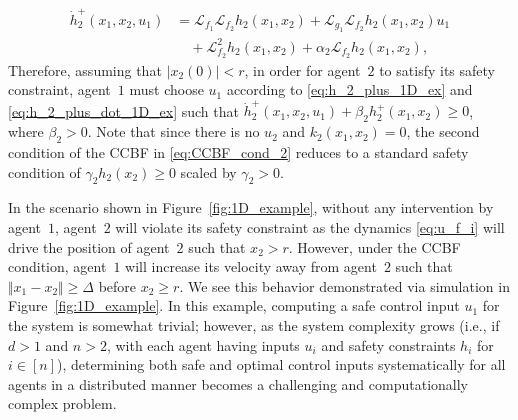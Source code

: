 \documentclass[letterpaper, 10 pt, conference]{ieeeconf}  %
\theoremstyle{plain}
\begin{document}
\vspace{-3.5ex}
\small
\begin{align}
    \dot{h}_2^+(x_1, x_2, u_1) &= \mathcal{L}_{f_1} \mathcal{L}_{f_2}  h_2(x_1, x_2) + \mathcal{L}_{g_1} \mathcal{L}_{f_2}  h_2(x_1, x_2) u_1 \nonumber \\ 
    & \quad + \mathcal{L}_{f_2}^2 h_2(x_1, x_2) + \alpha_2 \mathcal{L}_{f_2}h_2(x_1, x_2), \label{eq:h_2_plus_dot_1D_ex}
\end{align}
\normalsize
Therefore, assuming that $\vert x_2(0) \vert < r$, in order for agent~$2$ to satisfy its safety constraint, agent~$1$ must choose $u_1$ according to \eqref{eq:h_2_plus_1D_ex} and \eqref{eq:h_2_plus_dot_1D_ex} such that
$\dot{h}_2^+(x_1, x_2, u_1) + \beta_2 h_2^+(x_1, x_2) \geq 0$,
where $\beta_2 > 0$. Note that since there is no $u_2$ and $k_2(x_1, x_2) = 0$, the second condition of the CCBF in \eqref{eq:CCBF_cond_2} reduces to a standard safety condition of $\gamma_2 h_2(x_2) \geq 0$ scaled by $\gamma_2>0$. 

In the scenario shown in Figure~\ref{fig:1D_example}, without any intervention by agent~$1$, agent~$2$ will violate its safety constraint as the dynamics \eqref{eq:u_f_i} will drive the position of agent~$2$ such that $x_2 > r$. However, under the CCBF condition, agent~$1$ will increase its velocity away from agent~$2$ such that $\Vert x_1-x_2 \Vert \geq \Delta$  before $x_2 \geq r$. We see this behavior demonstrated via simulation in Figure~\ref{fig:1D_example}.
In this example, computing a safe control input $u_1$ for the system is somewhat trivial; however, as the system complexity grows (i.e., if $d>1$ and $n>2$, with each agent having inputs $u_i$ and safety constraints $h_i$ for $i \in [n]$), determining both safe and optimal control inputs systematically for all agents in a distributed manner becomes a challenging and computationally complex problem. 
\end{document}
